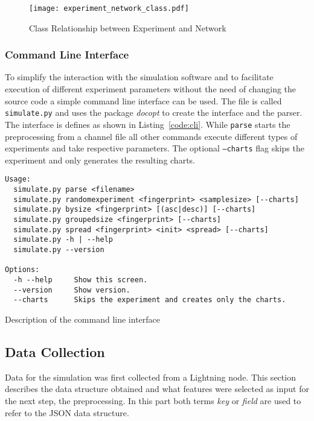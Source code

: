 \documentclass[final]{fhnwreport}       %
\begin{document}
\begin{figure}[H]
\centering
\texttt{[image: experiment\_network\_class.pdf]}
\caption{Class Relationship between Experiment and Network}
\label{fig:experiment_class}
\end{figure}

\subsubsection{Command Line Interface}
To simplify the interaction with the simulation software and to facilitate execution of different experiment parameters without the need of changing the source code a simple command line interface can be used. The file is called \texttt{simulate.py} and uses the package \emph{docopt} to create the interface and the parser. The interface is defines as shown in Listing~\ref{code:cli}. While \texttt{parse} starts the preprocessing from a channel file all other commands execute different types of experiments and take respective parameters. The optional \texttt{---charts} flag skips the experiment and only generates the resulting charts.

\begin{listing}[H]
  \begin{verbatim}
Usage:
  simulate.py parse <filename>
  simulate.py randomexperiment <fingerprint> <samplesize> [--charts]
  simulate.py bysize <fingerprint> [(asc|desc)] [--charts]
  simulate.py groupedsize <fingerprint> [--charts]
  simulate.py spread <fingerprint> <init> <spread> [--charts]
  simulate.py -h | --help
  simulate.py --version

Options:
  -h --help     Show this screen.
  --version     Show version.
  --charts      Skips the experiment and creates only the charts.

\end{verbatim}
\caption{Description of the command line interface}
\label{code:cli}
\end{listing}

\subsection{Data Collection}\label{subsec:datacol}
Data for the simulation was first collected from a Lightning node. This section describes the data structure obtained and what features were selected as input for the next step, the preprocessing. In this part both terms \emph{key} or \emph{field} are used to refer to the JSON data structure. 
\end{document}
